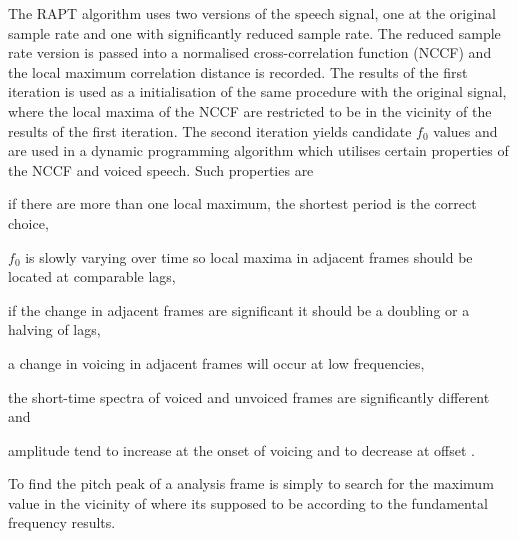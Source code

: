 The RAPT algorithm uses two versions of the speech signal, one at the original sample rate and one with significantly reduced sample rate. The reduced sample rate version is passed into a normalised cross-correlation function (NCCF) and the local maximum correlation distance is recorded. The results of the first iteration is used as a initialisation of the same procedure with the original signal, where the local maxima of the NCCF are restricted to be in the vicinity of the results of the first iteration. The second iteration yields candidate $f_0$ values and are used in a dynamic programming algorithm which utilises certain properties of the NCCF and voiced speech. Such properties are \begin{inparaenum} \item if there are more than one local maximum, the shortest period is the correct choice, \item $f_0$ is slowly varying over time so local maxima in adjacent frames should be located at comparable lags, \item if the change in adjacent frames are significant it should be a doubling or a halving of lags, \item a change in voicing in adjacent frames will occur at low frequencies, \item the short-time spectra of voiced and unvoiced frames are significantly different and \item amplitude tend to increase at the onset of voicing and to decrease at offset \cite{talkin95}.\end{inparaenum}

To find the pitch peak of a analysis frame is simply to search for the maximum value in the vicinity of where its supposed to be according to the fundamental frequency results.


